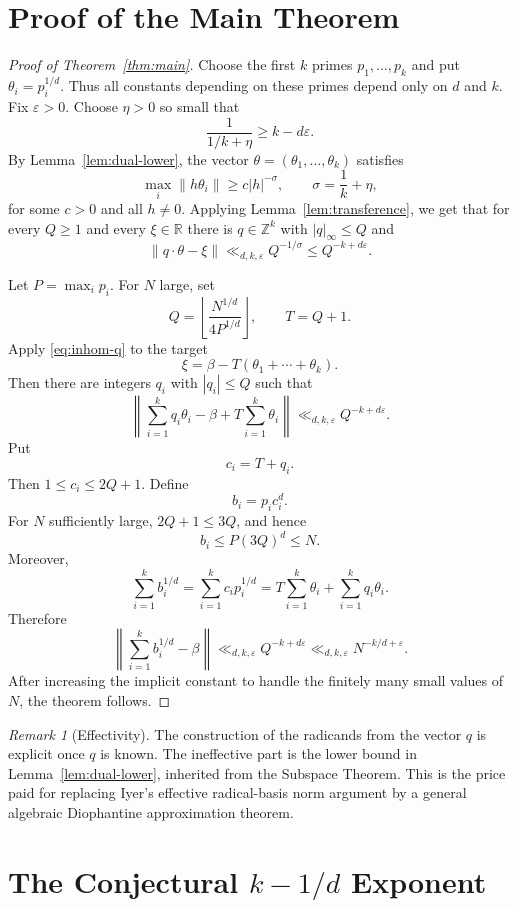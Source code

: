 \documentclass[11pt]{article}
\theoremstyle{remark}
\newtheorem{remark}[theorem]{Remark}
\newcommand{\R}{\mathbb R}
\newcommand{\Z}{\mathbb Z}
\newcommand{\eps}{\varepsilon}
\begin{document}
\section{Proof of the Main Theorem}\label{sec:main-proof}

\begin{proof}[Proof of Theorem~\ref{thm:main}]
Choose the first $k$ primes $p_1,\ldots,p_k$ and put $\theta_i=p_i^{1/d}$. Thus all constants depending on these primes depend only on $d$ and $k$. Fix $\eps>0$. Choose $\eta>0$ so small that
\[
  \frac{1}{1/k+\eta}\geq k-d\eps.
\]
By Lemma~\ref{lem:dual-lower}, the vector $\theta=(\theta_1,\ldots,\theta_k)$ satisfies
\[
  \max_i\|h\theta_i\|
  \geq c |h|^{-\sigma},
  \qquad
  \sigma=\frac1k+\eta,
\]
for some $c>0$ and all $h\ne0$. Applying Lemma~\ref{lem:transference}, we get that for every $Q\geq 1$ and every $\xi\in\R$ there is $q\in\Z^k$ with $|q|_\infty\leq Q$ and
\[
  \|q\cdot\theta-\xi\|
  \ll_{d,k,\eps} Q^{-1/\sigma}
  \leq Q^{-k+d\eps}.
  \tag{4.1}\label{eq:inhom-q}
\]

\smallskip
\noindent
Let $P=\max_i p_i$. For $N$ large, set
\[
  Q=\left\lfloor \frac{N^{1/d}}{4P^{1/d}}\right\rfloor,
  \qquad
  T=Q+1.
\]
Apply \eqref{eq:inhom-q} to the target
\[
  \xi=\beta-T(\theta_1+\cdots+\theta_k).
\]
Then there are integers $q_i$ with $|q_i|\leq Q$ such that
\[
  \left\|\sum_{i=1}^k q_i\theta_i-\beta+T\sum_{i=1}^k\theta_i\right\|
  \ll_{d,k,\eps} Q^{-k+d\eps}.
\]
Put
\[
  c_i=T+q_i.
\]
Then $1\leq c_i\leq 2Q+1$. Define
\[
  b_i=p_i c_i^d.
\]
For $N$ sufficiently large, $2Q+1\leq 3Q$, and hence
\[
  b_i\leq P(3Q)^d\leq N.
\]
Moreover,
\[
  \sum_{i=1}^k b_i^{1/d}
  =\sum_{i=1}^k c_i p_i^{1/d}
  =T\sum_{i=1}^k\theta_i+\sum_{i=1}^k q_i\theta_i.
\]
Therefore
\[
  \left\|\sum_{i=1}^k b_i^{1/d}-\beta\right\|
  \ll_{d,k,\eps} Q^{-k+d\eps}
  \ll_{d,k,\eps} N^{-k/d+\eps}.
\]
After increasing the implicit constant to handle the finitely many small values of $N$, the theorem follows.
\end{proof}

\begin{remark}[Effectivity]
The construction of the radicands from the vector $q$ is explicit once $q$ is known. The ineffective part is the lower bound in Lemma~\ref{lem:dual-lower}, inherited from the Subspace Theorem. This is the price paid for replacing Iyer's effective radical-basis norm argument by a general algebraic Diophantine approximation theorem.
\end{remark}

\section{The Conjectural \texorpdfstring{$k-1/d$}{k-1/d} Exponent}\label{sec:examples}
\end{document}
